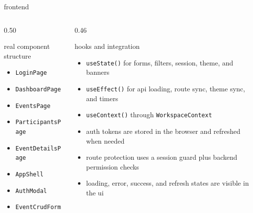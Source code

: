 \documentclass[aspectratio=169,11pt]{beamer}
\begin{document}
\begin{frame}{frontend}
  \small
  \begin{columns}[T]
    \begin{column}{0.50\textwidth}
      \begin{block}{real component structure}
        \begin{itemize}
          \item \texttt{LoginPage}
          \item \texttt{DashboardPage}
          \item \texttt{EventsPage}
          \item \texttt{ParticipantsPage}
          \item \texttt{EventDetailsPage}
          \item \texttt{AppShell}
          \item \texttt{AuthModal}
          \item \texttt{EventCrudForm}
        \end{itemize}
      \end{block}
    \end{column}
    \begin{column}{0.46\textwidth}
      \begin{exampleblock}{hooks and integration}
        \begin{itemize}
          \item \texttt{useState()} for forms, filters, session, theme, and banners
          \item \texttt{useEffect()} for api loading, route sync, theme sync, and timers
          \item \texttt{useContext()} through \texttt{WorkspaceContext}
          \item auth tokens are stored in the browser and refreshed when needed
          \item route protection uses a session guard plus backend permission checks
          \item loading, error, success, and refresh states are visible in the ui
        \end{itemize}
      \end{exampleblock}
    \end{column}
  \end{columns}
\end{frame}
\end{document}
